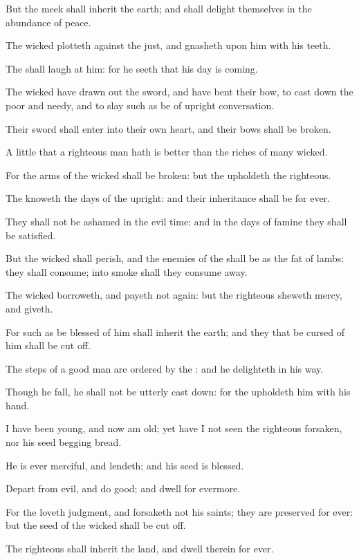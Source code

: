 \Verse But the meek shall inherit the earth; and shall delight themselves in the abundance of peace.

\Verse The wicked plotteth against the just, and gnasheth upon him with his teeth.

\Verse The \LORD shall laugh at him: for he seeth that his day is coming.

\Verse The wicked have drawn out the sword, and have bent their bow, to cast down the poor and needy, and to slay such as be of upright conversation.

\Verse Their sword shall enter into their own heart, and their bows shall be broken.

\Verse A little that a righteous man hath is better than the riches of many wicked.

\Verse For the arms of the wicked shall be broken: but the \LORD upholdeth the righteous.

\Verse The \LORD knoweth the days of the upright: and their inheritance shall be for ever.

\Verse They shall not be ashamed in the evil time: and in the days of famine they shall be satisfied.

\Verse But the wicked shall perish, and the enemies of the \LORD shall be as the fat of lambs: they shall consume; into smoke shall they consume away.

\Verse The wicked borroweth, and payeth not again: but the righteous sheweth mercy, and giveth.

\Verse For such as be blessed of him shall inherit the earth; and they that be cursed of him shall be cut off.

\Verse The steps of a good man are ordered by the \LORD: and he delighteth in his way.

\Verse Though he fall, he shall not be utterly cast down: for the \LORD upholdeth him with his hand.

\Verse I have been young, and now am old; yet have I not seen the righteous forsaken, nor his seed begging bread.

\Verse He is ever merciful, and lendeth; and his seed is blessed.

\Verse Depart from evil, and do good; and dwell for evermore.

\Verse For the \LORD loveth judgment, and forsaketh not his saints; they are preserved for ever: but the seed of the wicked shall be cut off.

\Verse The righteous shall inherit the land, and dwell therein for ever.

